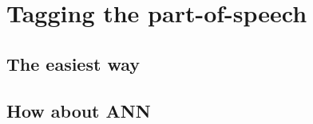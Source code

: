 \section{Tagging the part-of-speech}

\subsection{The easiest way}

\subsection{How about ANN}\label{chap:HMM_based_tagging}

